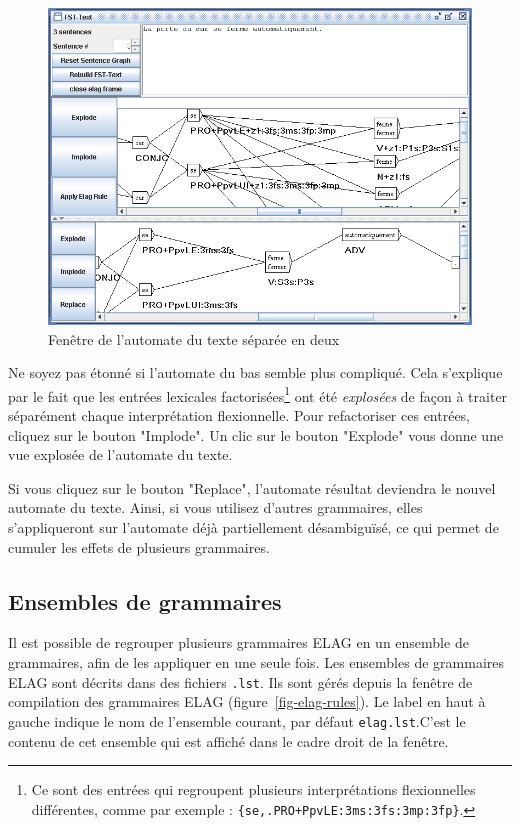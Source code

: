 \begin{figure}[!ht]
\begin{center}
\includegraphics[width=12cm]{resources/img/fig7-18.png}
\caption{Fenêtre de l’automate du texte séparée en deux \label{fig-text-auto2}}
\end{center}
\end{figure}


\bigskip
\noindent Ne soyez pas étonné si l’automate du bas semble plus compliqué. Cela s’explique par
le fait que les entrées lexicales factorisées\footnote{Ce sont des entrées qui regroupent
 plusieurs interprétations flexionnelles différentes, comme par exemple :
\texttt{\{se,.PRO+PpvLE:3ms:3fs:3mp:3fp\}}.}
ont été \textit{explosées} de façon à traiter séparément chaque interprétation flexionnelle.
Pour refactoriser ces entrées, cliquez sur le bouton "Implode". Un clic sur le bouton 
"Explode" vous donne une vue explosée de l’automate du texte.

\bigskip
\noindent Si vous cliquez sur le bouton "Replace", l’automate résultat deviendra le nouvel
automate du texte. Ainsi, si vous utilisez d’autres grammaires, elles s’appliqueront sur l’automate
déjà partiellement désambiguïsé, ce qui permet de cumuler les effets de plusieurs grammaires.



\subsection{Ensembles de grammaires}
Il est possible de regrouper plusieurs grammaires ELAG en un ensemble de grammaires,
afin de les appliquer en une seule fois. Les ensembles de grammaires ELAG sont décrits dans
des fichiers \verb+.lst+. Ils sont gérés depuis la fenêtre de compilation
des grammaires ELAG (figure~\ref{fig-elag-rules}). Le label en haut à gauche indique le nom de 
l’ensemble courant, par défaut \verb+elag.lst+.C’est le contenu de cet ensemble qui est affiché
dans le cadre droit de la fenêtre.


